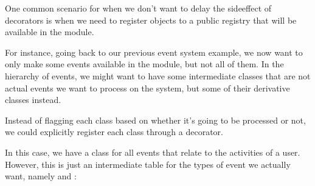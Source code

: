 \documentclass[a4paper,10pt,english]{sphinxmanual}
\begin{document}
One common scenario for when we don’t want to delay the side\sphinxhyphen{}effect of decorators is
when we need to register objects to a public registry that will be available in the module.

For instance, going back to our previous event system example, we now want to only
make some events available in the module, but not all of them. In the hierarchy of events,
we might want to have some intermediate classes that are not actual events we want to
process on the system, but some of their derivative classes instead.

Instead of flagging each class based on whether it’s going to be processed or not, we could
explicitly register each class through a decorator.

In this case, we have a class for all events that relate to the activities of a user. However, this
is just an intermediate table for the types of event we actually want, namely
 and :

\begin{sphinxVerbatim}[commandchars=\\\{\}]
  

 
    \PYG{p}{[}\PYG{p}{]}  
     

 

 
      

 

 
\end{sphinxVerbatim}
\end{document}
